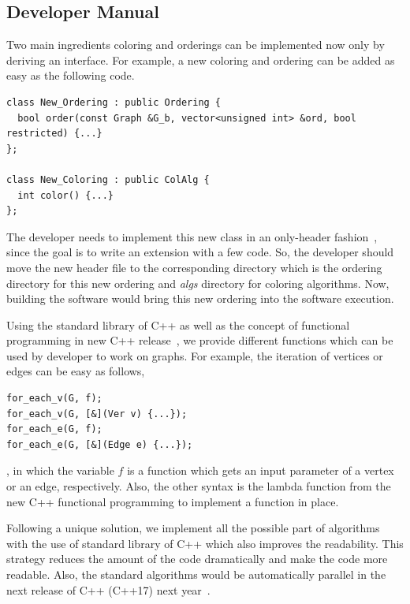 \documentclass[11pt, twoside,a4paper]{book}
\begin{document}
\subsection{Developer Manual}
\label{s.new.ext}
Two main ingredients coloring and orderings can be implemented now only by deriving an interface.
For example, a new coloring and ordering can be added as easy as the following code.
\begin{lstlisting}
class New_Ordering : public Ordering {
  bool order(const Graph &G_b, vector<unsigned int> &ord, bool restricted) {...}
};

class New_Coloring : public ColAlg {
  int color() {...}
};
\end{lstlisting}

The developer needs to implement this new class in an only-header fashion~\cite{headeronly},
since the goal is to write an extension with a few code. So, the developer should
move the new header file to the corresponding directory which is the ordering directory
for this new ordering and \textit{algs} directory for coloring algorithms.
Now, building the software would bring this new ordering into the software execution.

Using the standard library of C++ as well as the concept of functional programming
in new C++ release~\cite{Sutherland2015}, we provide different functions which can be used
by developer to work on graphs. For example, the iteration of vertices
or edges can be easy as follows,
\begin{lstlisting}
for_each_v(G, f);
for_each_v(G, [&](Ver v) {...});
for_each_e(G, f);
for_each_e(G, [&](Edge e) {...});
\end{lstlisting}
, in which the variable $f$ is a function which gets an input parameter
of a vertex or an edge, respectively.
Also, the other syntax is the lambda function
from the new C++ functional programming to implement a function in place.

Following a unique solution, we implement all the possible part of algorithms
with the use of standard library of C++ which also improves the readability.
This strategy reduces the amount of the code dramatically and
make the code more readable.
Also, the standard algorithms would be automatically parallel in the next
release of C++ (C++17) next year~\cite{parallelcpp}.
\end{document}
